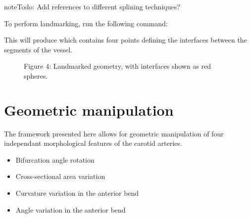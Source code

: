 \documentclass[letterpaper,10pt,english]{sphinxmanual}
\begin{document}
\begin{sphinxadmonition}{note}{\label{getting_started:index-0}Todo:}
Add references to different splining techniques?
\end{sphinxadmonition}

To perform landmarking, run the following command:

%
\begin{sphinxVerbatim}[commandchars=\\\{\}]
   \PYG{p}{[}\PYG{p}{]}  \PYG{p}{[}\PYG{p}{]}  \PYG{p}{[}\PYG{p}{]}
\end{sphinxVerbatim}

This will produce  which contains four points defining the interfaces between the segments of the vessel.

\begin{figure}[htbp]
\centering
\capstart

\noindent{}
\caption{Figure 4: Landmarked geometry, with interfaces shown as red spheres.}\label{\detokenize{getting_started:id4}}\end{figure}


\section{Geometric manipulation}
\label{\detokenize{getting_started:geometric-manipulation}}
The framework presented here allows for geometric manipulation of four independant
morphological features of the carotid arteries.
\begin{itemize}
\item {} 
Bifurcation angle rotation

\item {} 
Cross-sectional area variation

\item {} 
Curvature variation in the anterior bend

\item {} 
Angle variation in the anterior bend

\end{itemize}
\end{document}
